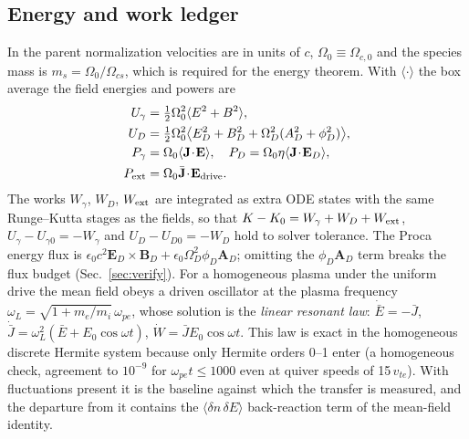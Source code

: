 \documentclass[aps,pre,reprint,floatfix,amsmath,amssymb,nofootinbib,superscriptaddress]{revtex4-2}
\newcommand{\wpe}{\omega_{pe}}
\newcommand{\Wext}{W_{\rm ext}}
\begin{document}
\subsection{Energy and work ledger}
In the parent normalization velocities are in units of $c$, $\Omega_0\equiv\Omega_{c,0}$ and the species mass is $m_s=\Omega_0/\Omega_{cs}$, which is required for the energy theorem. With $\langle\cdot\rangle$ the box average the field energies and powers are
\begin{align}
U_\gamma&=\tfrac12\Omega_0^2\langle E^2+B^2\rangle,\\
U_D&=\tfrac12\Omega_0^2\big\langle E_D^2+B_D^2+\Omega_D^2(A_D^2+\phi_D^2)\big\rangle,\\
P_\gamma&=\Omega_0\langle\mathbf J\!\cdot\!\mathbf E\rangle,\quad
P_D=\Omega_0\eta\langle\mathbf J\!\cdot\!\mathbf E_D\rangle,\\
P_{\rm ext}&=\Omega_0\bar{\mathbf J}\!\cdot\!\mathbf E_{\rm drive}.
\end{align}
The works $W_\gamma$, $W_D$, $\Wext$ are integrated as extra ODE states with the same Runge--Kutta stages as the fields, so that $K-K_0=W_\gamma+W_D+\Wext$, $U_\gamma-U_{\gamma0}=-W_\gamma$ and $U_D-U_{D0}=-W_D$ hold to solver tolerance. The Proca energy flux is $\epsilon_0c^2\mathbf E_D\times\mathbf B_D+\epsilon_0\Omega_D^2\phi_D\mathbf A_D$; omitting the $\phi_D\mathbf A_D$ term breaks the flux budget (Sec.~\ref{sec:verify}). For a homogeneous plasma under the uniform drive the mean field obeys a driven oscillator at the plasma frequency $\omega_L=\sqrt{1+m_e/m_i}\,\wpe$, whose solution is the \emph{linear resonant law}: $\dot{\bar E}=-\bar J$, $\dot{\bar J}=\omega_L^2(\bar E+E_0\cos\omega t)$, $\dot W=\bar J E_0\cos\omega t$. This law is exact in the homogeneous discrete Hermite system because only Hermite orders 0--1 enter (a homogeneous check, agreement to $10^{-9}$ for $\wpe t\le1000$ even at quiver speeds of 15\,$v_{te}$). With fluctuations present it is the baseline against which the transfer is measured, and the departure from it contains the $\langle\delta n\,\delta E\rangle$ back-reaction term of the mean-field identity.
\end{document}
